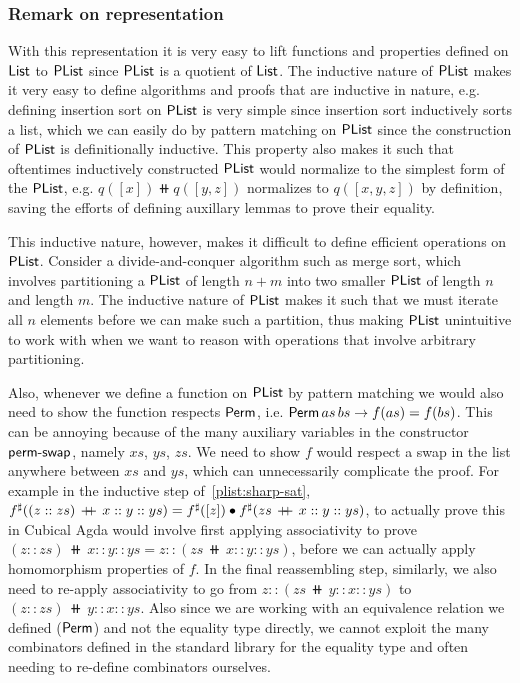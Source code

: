\subsubsection*{Remark on representation}\label{plist:rep}
With this representation it is very easy to lift functions and properties defined on $\operatorname{\mathsf{List}}$
to $\operatorname{\mathsf{PList}}$ since $\operatorname{\mathsf{PList}}$ is a quotient of $\operatorname{\mathsf{List}}$. The inductive nature of $\operatorname{\mathsf{PList}}$ makes it
very easy to define algorithms and proofs that are inductive in nature, e.g. defining insertion sort
on $\operatorname{\mathsf{PList}}$ is very simple since insertion sort inductively sorts a list, which we can easily do by
pattern matching on $\operatorname{\mathsf{PList}}$ since the construction of $\operatorname{\mathsf{PList}}$ is definitionally inductive.
This property also makes it such that oftentimes inductively constructed $\operatorname{\mathsf{PList}}$ would normalize to the
simplest form of the $\operatorname{\mathsf{PList}}$, e.g. $q([ x ]) \doubleplus q([y, z])$ normalizes to $q([x,y,z])$ by
definition, saving the efforts of defining auxillary lemmas to prove their equality.

This inductive nature, however, makes it difficult to define efficient operations on $\operatorname{\mathsf{PList}}$. Consider a
divide-and-conquer algorithm such as merge sort, which involves partitioning a $\operatorname{\mathsf{PList}}$ of length $n+m$ into
two smaller $\operatorname{\mathsf{PList}}$ of length $n$ and length $m$. The inductive nature of $\operatorname{\mathsf{PList}}$ makes it such that
we must iterate all $n$ elements before we can make such a partition, thus making $\operatorname{\mathsf{PList}}$ unintuitive
to work with when we want to reason with operations that involve arbitrary partitioning.

Also, whenever we define a function on $\operatorname{\mathsf{PList}}$ by pattern matching we would also need to show
the function respects $\operatorname{\mathsf{Perm}}$, i.e. $\operatorname{\mathsf{Perm}} as\,bs \to f(as) = f(bs)$. This can be annoying because
of the many auxiliary variables in the constructor $\operatorname{\mathsf{perm-swap}}$, namely $xs$, $ys$, $zs$.
We need to show $f$ would respect a swap in the list anywhere between $xs$ and $ys$, which can
unnecessarily complicate the proof. For example in the inductive step of~\cref{plist:sharp-sat},
${f}^{\sharp}((z :: zs)\,\mathbin{+\kern -0.4em+}\,x :: y :: ys) = {f}^{\sharp}([ z ]) \mathbin{\bullet} {f}^{\sharp}(zs\,\mathbin{+\kern -0.4em+}\,x :: y :: ys)$,
to actually prove this in Cubical Agda would involve first applying associativity to prove
$(z :: zs)\,\doubleplus\,x :: y :: ys = z :: (zs\,\doubleplus\,x :: y :: ys)$, before we can actually
apply homomorphism properties of $f$. In the final reassembling step, similarly,
we also need to re-apply associativity to go from $z :: (zs\,\doubleplus\,y :: x :: ys)$
to $(z :: zs)\,\doubleplus\,y :: x :: ys$. Also since we are working with an equivalence relation we
defined ($\operatorname{\mathsf{Perm}}$) and not the equality type directly, we cannot exploit the many combinators defined
in the standard library for the equality type and often needing to re-define combinators ourselves.

